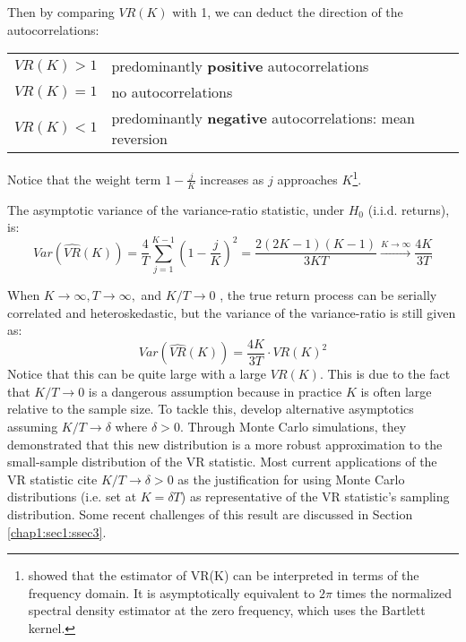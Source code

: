 Then by comparing $VR(K)$ with 1, we can deduct the direction of the autocorrelations:
\begin{center}
    \begin{tabular}{rl}
    \hline
    $VR(K) > 1$ & predominantly \textbf{positive} autocorrelations  \\ 
    $VR(K) = 1$ & no autocorrelations \\ 
    $VR(K) < 1$ & predominantly \textbf{negative} autocorrelations: mean reversion \\
    \hline
    \end{tabular}
\end{center}
Notice that the weight term $1-\frac{j}{K}$ increases as $j$ approaches $K$\footnote{\citet{cochrane1988big} showed that the estimator of VR(K) can be 
interpreted in terms of the frequency domain. It is asymptotically equivalent to $2\pi$ times the normalized spectral density
estimator at the zero frequency, which uses the Bartlett kernel.}.

The asymptotic variance of the variance-ratio statistic, under $H_0$ (i.i.d. returns), is:
\begin{equation}
    Var(\hat{VR}(K))=\frac{4}{T}\sum^{K-1}_{j=1}\left(1-\frac{j}{K}\right)^2=\frac{2(2K-1)(K-1)}{3KT} \xrightarrow{K\rightarrow \infty} \frac{4K}{3T}
\end{equation}

When $K\rightarrow\infty,T\rightarrow\infty,$ and $K/T\rightarrow 0$ \citep[p.~463]{priestley1981spectral}, 
the true return process can be serially correlated and heteroskedastic, but the variance of the variance-ratio
is still given as:
\begin{equation}
    Var(\hat{VR}(K)) = \frac{4K}{3T}\cdot VR(K)^2
\end{equation}
Notice that this can be quite large with a large $VR(K)$. This is due to the fact that $K/T\rightarrow0$ is a dangerous 
assumption because in practice $K$ is often large relative to the sample size. To tackle this, \citet{lo1988stock} develop
alternative asymptotics assuming $K/T\rightarrow \delta$ where $\delta>0$. Through Monte Carlo simulations, they demonstrated
that this new distribution is a more robust approximation to the small-sample distribution of the VR statistic. Most current applications
of the VR statistic cite $K/T \rightarrow \delta >0$ as the justification for using Monte Carlo distributions (i.e. set at $K=\delta T$) as
representative of the VR statistic's sampling distribution. Some recent challenges of this result are discussed in Section \ref{chap1:sec1:ssec3}.

